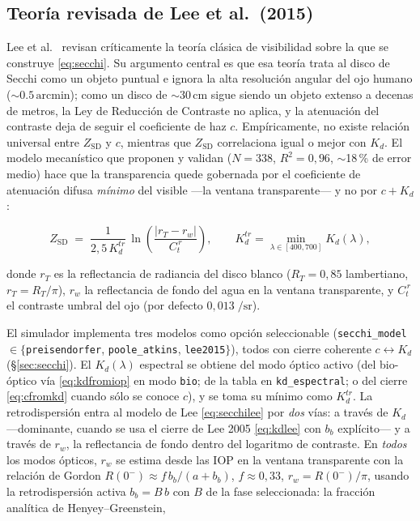 \documentclass[11pt,a4paper]{article}
\newcommand{\si}[1]{\ensuremath{#1}}
\newcommand{\SI}[2]{\ensuremath{#1\,#2}}
\newcommand{\meter}{\mathrm{m}}
\newcommand{\steradian}{\mathrm{sr}}
\newcommand{\per}{/}
\newcommand{\centi}[1]{\mathrm{c}#1}
\newcommand{\arcmin}{\mathrm{arcmin}}
\newcommand{\code}[1]{\texttt{#1}}
\begin{document}
\subsection{Teoría revisada de Lee et al.\ (2015)}\label{sec:lee2015}

Lee et al.~\cite{lee2015} revisan críticamente la teoría clásica de visibilidad
sobre la que se construye \eqref{eq:secchi}. Su argumento central es que esa teoría
trata al disco de Secchi como un objeto puntual e ignora la alta resolución angular
del ojo humano ($\sim$\SI{0.5}{\arcmin}); como un disco de $\sim$\SI{30}{\centi\meter}
sigue siendo un objeto extenso a decenas de metros, la Ley de Reducción de Contraste
no aplica, y la atenuación del contraste deja de seguir el coeficiente de haz $c$.
Empíricamente, no existe relación universal entre $Z_\text{SD}$ y $c$, mientras que
$Z_\text{SD}$ correlaciona igual o mejor con $K_d$. El modelo mecanístico que
proponen y validan ($N=338$, $R^2=0{,}96$, $\sim$18\,\% de error medio) hace que la
transparencia quede gobernada por el coeficiente de atenuación difusa \emph{mínimo}
del visible —la ventana transparente— y no por $c+K_d$:

\begin{equation}
Z_\text{SD} \;=\; \frac{1}{2{,}5\,K_d^{tr}}\,
\ln\!\left(\frac{|r_T - r_w|}{C_t^{\,r}}\right),
\qquad K_d^{tr} = \min_{\lambda\in[400,700]} K_d(\lambda),
\label{eq:secchilee}
\end{equation}

donde $r_T$ es la reflectancia de radiancia del disco blanco
($R_T=0{,}85$ lambertiano, $r_T=R_T/\pi$), $r_w$ la reflectancia de fondo del agua
en la ventana transparente, y $C_t^{\,r}$ el contraste umbral del ojo
(por defecto $0{,}013\;\si{\per\steradian}$).

El simulador implementa tres modelos como opción seleccionable\label{sec:secchimodelos}
(\code{secchi\_model} $\in\{$\code{preisendorfer}, \code{poole\_atkins}, \code{lee2015}$\}$),
todos con cierre coherente $c\leftrightarrow K_d$ (\S\ref{sec:secchi}). El $K_d(\lambda)$
espectral se obtiene del modo óptico activo (del bio-óptico vía \eqref{eq:kdfromiop}
en modo \code{bio}; de la tabla en \code{kd\_espectral}; o del cierre \eqref{eq:cfromkd}
cuando sólo se conoce $c$), y se toma su mínimo como $K_d^{tr}$. La retrodispersión
entra al modelo de Lee \eqref{eq:secchilee} por \emph{dos} vías: a través de $K_d$
—dominante, cuando se usa el cierre de Lee 2005 \eqref{eq:kdlee} con $b_b$ explícito—
y a través de $r_w$, la reflectancia de fondo dentro del logaritmo de contraste. En
\emph{todos} los modos ópticos, $r_w$ se estima desde las IOP en la ventana
transparente con la relación de Gordon $R(0^-)\approx f\,b_b/(a+b_b)$,
$f\approx0{,}33$, $r_w=R(0^-)/\pi$, usando la retrodispersión activa $b_b=B\,b$ con
$B$ de la fase seleccionada: la fracción analítica de Henyey--Greenstein,
\end{document}
